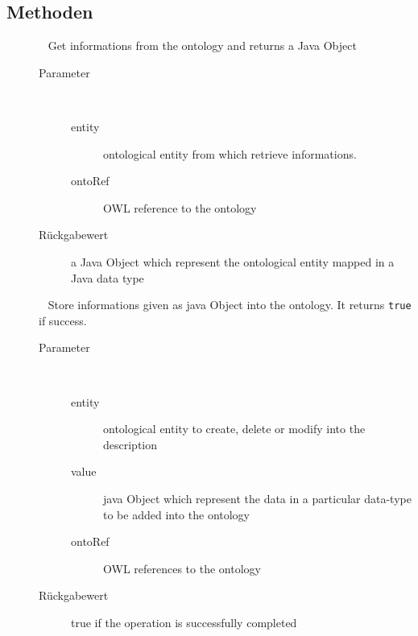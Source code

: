 \subsection{Methoden}
\begin{description}
\item[{\label{ontologyFramework.OFDataMapping.OFDataMapperInterface.mapFromOntology(OntoEntity,ontologyFramework.OFContextManagement.OWLReferences)}}]
~ Get informations from the ontology and returns a Java Object
\begin{description}
\item[Parameter] ~
\begin{description}
\item[entity]
ontological entity from which retrieve informations.
\item[ontoRef]
OWL reference to the ontology
\end{description}
\item[Rückgabewert] 
a Java Object which represent the ontological entity mapped in a Java data type
\end{description}
\item[{\label{ontologyFramework.OFDataMapping.OFDataMapperInterface.mapToOntology(OntoEntity,R,ontologyFramework.OFContextManagement.OWLReferences)}}]
~ Store informations given as java Object into the ontology. It returns 
 \verb!true! if success.
\begin{description}
\item[Parameter] ~
\begin{description}
\item[entity]
ontological entity to create, delete or modify into the description
\item[value]
java Object which represent the data in a particular data-type to be added into the ontology
\item[ontoRef]
OWL references to the ontology
\end{description}
\item[Rückgabewert] 
true if the operation is successfully completed
\end{description}
\item[{\label{ontologyFramework.OFDataMapping.OFDataMapperInterface.removeFromOntology(OntoEntity,R,ontologyFramework.OFContextManagement.OWLReferences)}}]

\end{description}
